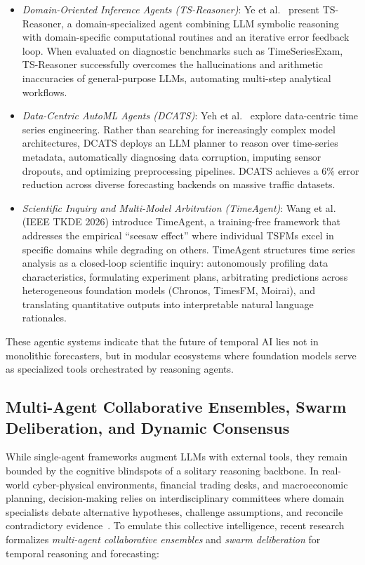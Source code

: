 \begin{itemize}[leftmargin=*]
    \item \emph{Domain-Oriented Inference Agents (TS-Reasoner)}: Ye et al.~\cite{ye2024tsreasoner} present TS-Reasoner, a domain-specialized agent combining LLM symbolic reasoning with domain-specific computational routines and an iterative error feedback loop. When evaluated on diagnostic benchmarks such as TimeSeriesExam, TS-Reasoner successfully overcomes the hallucinations and arithmetic inaccuracies of general-purpose LLMs, automating multi-step analytical workflows.
    \item \emph{Data-Centric AutoML Agents (DCATS)}: Yeh et al.~\cite{yeh2025dcats} explore data-centric time series engineering. Rather than searching for increasingly complex model architectures, DCATS deploys an LLM planner to reason over time-series metadata, automatically diagnosing data corruption, imputing sensor dropouts, and optimizing preprocessing pipelines. DCATS achieves a $6\%$ error reduction across diverse forecasting backends on massive traffic datasets.
    \item \emph{Scientific Inquiry and Multi-Model Arbitration (TimeAgent)}: Wang et al. (IEEE TKDE 2026) introduce TimeAgent, a training-free framework that addresses the empirical ``seesaw effect'' where individual TSFMs excel in specific domains while degrading on others. TimeAgent structures time series analysis as a closed-loop scientific inquiry: autonomously profiling data characteristics, formulating experiment plans, arbitrating predictions across heterogeneous foundation models (Chronos, TimesFM, Moirai), and translating quantitative outputs into interpretable natural language rationales.
\end{itemize}
These agentic systems indicate that the future of temporal AI lies not in monolithic forecasters, but in modular ecosystems where foundation models serve as specialized tools orchestrated by reasoning agents.

\subsection{Multi-Agent Collaborative Ensembles, Swarm Deliberation, and Dynamic Consensus}
\label{sec:multiagent_collaborative_ensembles}

While single-agent frameworks augment LLMs with external tools, they remain bounded by the cognitive blindspots of a solitary reasoning backbone. In real-world cyber-physical environments, financial trading desks, and macroeconomic planning, decision-making relies on interdisciplinary committees where domain specialists debate alternative hypotheses, challenge assumptions, and reconcile contradictory evidence~\cite{kang2026traceable}. To emulate this collective intelligence, recent research formalizes \emph{multi-agent collaborative ensembles} and \emph{swarm deliberation} for temporal reasoning and forecasting:

